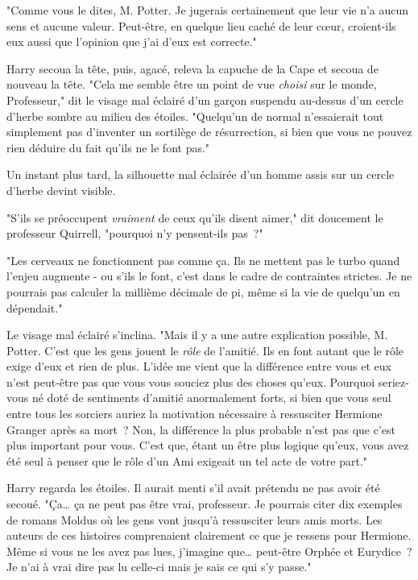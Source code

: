"Comme vous le dites, M. Potter. Je jugerais certainement que leur vie n'a aucun sens et aucune valeur. Peut-être, en quelque lieu caché de leur cœur, croient-ils eux aussi que l'opinion que j'ai d'eux est correcte."

Harry secoua la tête, puis, agacé, releva la capuche de la Cape et secoua de nouveau la tête. "Cela me semble être un point de vue \emph{choisi} sur le monde, Professeur," dit le visage mal éclairé d'un garçon suspendu au-dessus d'un cercle d'herbe sombre au milieu des étoiles. "Quelqu'un de normal n'essaierait tout simplement pas d'inventer un sortilège de résurrection, si bien que vous ne pouvez rien déduire du fait qu'ils ne le font pas."

Un instant plus tard, la silhouette mal éclairée d'un homme assis sur un cercle d'herbe devint visible.

"S'ils se préoccupent \emph{vraiment} de ceux qu'ils disent aimer," dit doucement le professeur Quirrell, "pourquoi n'y pensent-ils pas~?"

"Les cerveaux ne fonctionnent pas comme ça. Ils ne mettent pas le turbo quand l'enjeu augmente - ou s'ils le font, c'est dans le cadre de contraintes strictes. Je ne pourrais pas calculer la millième décimale de pi, même si la vie de quelqu'un en dépendait."

Le visage mal éclairé s'inclina. "Mais il y a une autre explication possible, M. Potter. C'est que les gens jouent le \emph{rôle} de l'amitié. Ils en font autant que le rôle exige d'eux et rien de plus. L'idée me vient que la différence entre vous et eux n'est peut-être pas que vous vous souciez plus des choses qu'eux. Pourquoi seriez-vous né doté de sentiments d'amitié anormalement forts, si bien que vous seul entre tous les sorciers auriez la motivation nécessaire à ressusciter Hermione Granger après sa mort~? Non, la différence la plus probable n'est pas que c'est plus important pour vous. C'est que, étant un être plus logique qu'eux, vous avez été seul à penser que le rôle d'un Ami exigeait un tel acte de votre part."

Harry regarda les étoiles. Il aurait menti s'il avait prétendu ne pas avoir été secoué. "Ça… ça ne peut pas être vrai, professeur. Je pourrais citer dix exemples de romans Moldus où les gens vont jusqu'à ressusciter leurs amis morts. Les auteurs de ces histoires comprenaient clairement ce que je ressens pour Hermione. Même si vous ne les avez pas lues, j'imagine que… peut-être Orphée et Eurydice~? Je n'ai à vrai dire pas lu celle-ci mais je sais ce qui s'y passe."

